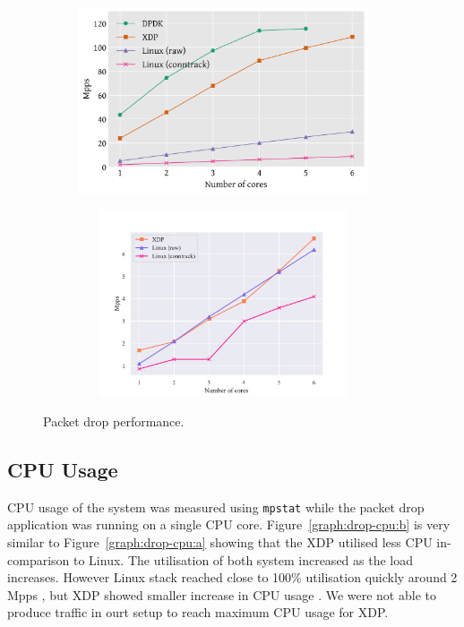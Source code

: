 \documentclass[12pt,titlepage]{article}
\begin{document}
\begin{figure}
    \centering
    \begin{minipage}{0.49\textwidth}
        \centering
        \includegraphics[width=0.95\textwidth,height=5.5cm]{original/drop-test.pdf} %
        \label{graph:xdp-drop:a}
    \end{minipage}\hfill
    \begin{minipage}{0.49\textwidth}
        \centering
        \includegraphics[width=0.95\textwidth,height=5.5cm]{img/drop-test.pdf} %
        \label{graph:xdp-drop:b}
    \end{minipage}
     \caption{Packet drop performance.}
     \label{graph:xdp-drop}
\end{figure}

\subsection{CPU Usage}

CPU usage of the system was measured using \texttt{mpstat} while the packet drop application was running on a single CPU core. Figure~\ref{graph:drop-cpu:b} is very similar to Figure~\ref{graph:drop-cpu:a} showing that the XDP utilised less CPU in-comparison to Linux. The utilisation of both system increased as the load increases. However Linux stack reached close to  100\% utilisation quickly around 2 Mpps , but XDP showed smaller increase in CPU usage . We were not able to produce traffic in ourt setup to reach maximum CPU usage for XDP.
\end{document}
